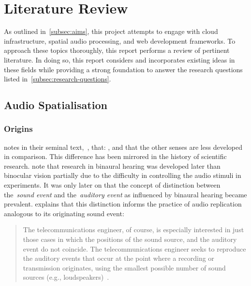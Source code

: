 
\thispagestyle{plain}
\newpage
\section{Literature Review}\label{sec:literature-review}

\normalsize

As outlined in~\ref{subsec:aims}, this project attempts to engage with cloud infrastructure, spatial audio processing, and web development frameworks.
To approach these topics thoroughly, this report performs a review of pertinent literature.
In doing so, this report considers and incorporates existing ideas in these fields while providing a strong foundation to answer the research questions listed in~\ref{subsec:research-questions}.

\subsection{Audio Spatialisation}\label{subsec:audio-spatialisation}
\subsubsection{Origins}

\citet{blauert_spatial} notes in their seminal text,~\textit{}, that: , and that the other senses are less developed in comparison.
This difference has been mirrored in the history of scientific research.
\citet{wade_binaural} note that research in binaural hearing was developed later than binocular vision partially due to the difficulty in controlling the audio stimuli in experiments.
It was only later on that the concept of distinction between the~\textit{sound event} and the~\textit{auditory event} as influenced by binaural hearing became prevalent.
\citet{blauert_spatial} explains that this distinction informs the practice of audio replication analogous to its originating sound event:

\begin{quotation}
    The telecommunications engineer, of course, is especially interested in just those cases in which the positions of the sound source, and the auditory event do not coincide.
    The telecommunications engineer seeks to reproduce the auditory events that occur at the point where a recording or transmission originates, using the smallest possible number of sound sources (e.g., loudspeakers)~\citep{blauert_spatial}.
\end{quotation}

